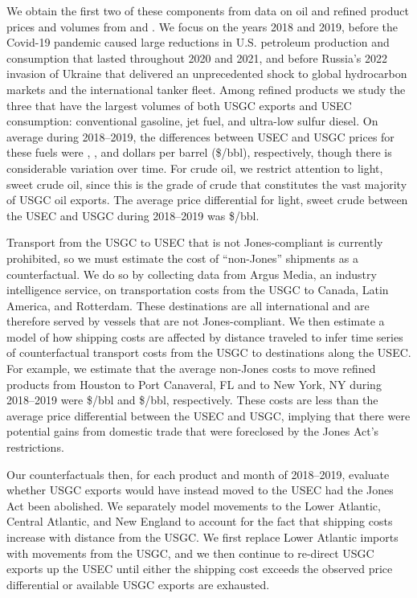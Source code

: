 \documentclass[12pt]{article}
\begin{document}
We obtain the first two of these components from data on oil and refined product prices and volumes from \cite{Bloomberg2023} and \cite{EIApetroleum}. We focus on the years 2018 and 2019, before the Covid-19 pandemic caused large reductions in U.S. petroleum production and consumption that lasted throughout 2020 and 2021, and before Russia's 2022 invasion of Ukraine that delivered an unprecedented shock to global hydrocarbon markets and the international tanker fleet. Among refined products we study the three that have the largest volumes of both USGC exports and USEC consumption: conventional gasoline, jet fuel, and ultra-low sulfur diesel. On average during 2018--2019, the differences between USEC and USGC prices for these fuels were \unskip, \unskip, and dollars per barrel (\$/bbl), respectively, though there is considerable variation over time. For crude oil, we restrict attention to light, sweet crude oil, since this is the grade of crude that constitutes the vast majority of USGC oil exports. The average price differential for light, sweet crude between the USEC and USGC during 2018--2019 was \$\unskip/bbl.

Transport from the USGC to USEC that is not Jones-compliant is currently prohibited, so we must estimate the cost of ``non-Jones'' shipments as a counterfactual. We do so by collecting data from Argus Media, an industry intelligence service, on transportation costs from the USGC to Canada, Latin America, and Rotterdam. These destinations are all international and are therefore served by vessels that are not Jones-compliant. We then estimate a model of how shipping costs are affected by distance traveled to infer time series of counterfactual transport costs from the USGC to destinations along the USEC. For example, we estimate that the average non-Jones costs to move refined products from Houston to Port Canaveral, FL and to New York, NY during 2018--2019 were \$\unskip/bbl and \$\unskip/bbl, respectively. These costs are less than the average price differential between the USEC and USGC, implying that there were potential gains from domestic trade that were foreclosed by the Jones Act's restrictions.

Our counterfactuals then, for each product and month of 2018--2019, evaluate whether USGC exports would have instead moved to the USEC had the Jones Act been abolished. We separately model movements to the Lower Atlantic, Central Atlantic, and New England to account for the fact that shipping costs increase with distance from the USGC. We first replace Lower Atlantic imports with movements from the USGC, and we then continue to re-direct USGC exports up the USEC until either the shipping cost exceeds the observed price differential or available USGC exports are exhausted.
\end{document}

